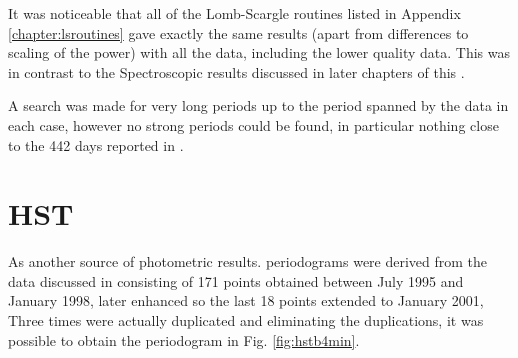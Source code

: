 \begin{table}[!htbp]
\centering
{}
\caption{Summary of three strongest periods taken from Class B and lower quality values in {\asas} datasets for {\prox}
  based upon magnitudes measured between December 2000 and September 2009 binned to 18 minutes.}
\protect\label{table:lqasas}
\end{table}

It was noticeable that all of the Lomb-Scargle routines listed in Appendix \ref{chapter:lsroutines} gave exactly
the same results (apart from differences to scaling of the power) with all the {\asas} data, including the lower quality
data. This was in contrast to the Spectroscopic results discussed in later chapters of this \paperorthesis.

A search was made for very long periods up to the period spanned by the data in each case, however no strong periods
could be found, in particular nothing close to the 442 days reported in \citet{cincunegui07}.

\section{HST}
\protect\label{section:hst}

As another source of photometric results. periodograms were derived from the  {\hst} data discussed in
\citealt{benedict92,benedict98} consisting of 171 points obtained between July 1995 and January 1998, later enhanced so
the last 18 points extended to January 2001, Three times were actually duplicated and eliminating the duplications, it
was possible to obtain the periodogram in Fig. \ref{fig:hstb4min}.

